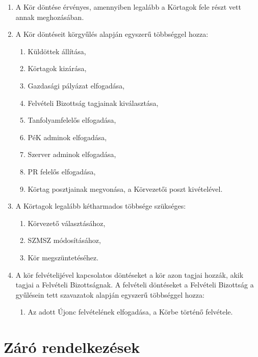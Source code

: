 \documentclass[12pt]{article}
\begin{document}
\begin{enumerate}

  \item A Kör döntése érvényes, amennyiben legalább a Körtagok fele részt vett annak meghozásában.
  \item A Kör döntéseit körgyűlés alapján egyszerű többséggel hozza:
  \begin{enumerate}
    \item Küldöttek állítása,
    \item Körtagok kizárása,
    \item Gazdasági pályázat elfogadása,
    \item Felvételi Bizottság tagjainak kiválasztása,
    \item Tanfolyamfelelős elfogadása,
    \item PéK adminok elfogadása,
    \item Szerver adminok elfogadása,
    \item PR felelős elfogadása,
    \item Körtag posztjainak megvonása, a Körvezetői poszt kivételével.
  \end{enumerate}
  \item A Körtagok legalább kétharmados többsége szükséges:
  \begin{enumerate}
    \item Körvezető választásához,
    \item SZMSZ módosításához,
    \item Kör megszüntetéséhez.
  \end{enumerate}
  \item A kör felvételijével kapcsolatos döntéseket a kör azon tagjai hozzák, akik tagjai a Felvételi Bizottságnak. A felvételi döntéseket a Felvételi Bizottság a gyűlésein tett szavazatok alapján egyszerű többséggel hozza:
  \begin{enumerate}
    \item Az adott Újonc felvételének elfogadása, a Körbe történő felvétele.
  \end{enumerate}
  
\end{enumerate}


\section{Záró rendelkezések}
\end{document}
